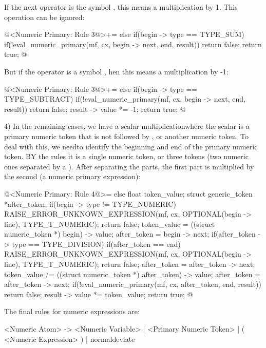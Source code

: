 If the next operator is the symbol \monoespaco{+}, this means a
multiplication by 1. This operation can be ignored:

\iniciocodigo
@<Numeric Primary: Rule 3@>+=
else if(begin -> type == TYPE_SUM){
  if(!eval_numeric_primary(mf, cx, begin -> next, end, result))
    return false;
  return true;
}
@
\fimcodigo

But if the operator is a symbol \monoespaco{-}, hen this means a
multiplication by -1:

\iniciocodigo
@<Numeric Primary: Rule 3@>+=
else if(begin -> type == TYPE_SUBTRACT){
  if(!eval_numeric_primary(mf, cx, begin -> next, end, result))
    return false;
  result -> value *= -1;
  return true;
}
@
\fimcodigo

4) In the remaining cases, we have a scalar multiplicationwhere the
scalar is a primary numeric token that is not followed
by \monoespaco{+}, \monoespaco{-} or another numeric token. To deal
with this, we needto identify the beginning and end of the primary
numeric token. BY the rules it is a single numeric token, or three
tokens (two numeric ones separated by a \monoespaco{/}). After
separating the parts, the first part is multiplied by the second (a
numeric primary expression):

\iniciocodigo
@<Numeric Primary: Rule 4@>=
else{
  float token_value;
  struct generic_token *after_token;
  if(begin -> type != TYPE_NUMERIC){
    RAISE_ERROR_UNKNOWN_EXPRESSION(mf, cx, OPTIONAL(begin -> line),
                                   TYPE_T_NUMERIC);
    return false;
  }
  token_value = ((struct numeric_token *) begin) -> value;
  after_token = begin -> next;
  if(after_token -> type == TYPE_DIVISION){
    if(after_token == end){
      RAISE_ERROR_UNKNOWN_EXPRESSION(mf, cx, OPTIONAL(begin -> line),
                                     TYPE_T_NUMERIC);
      return false;
    }
    after_token = after_token -> next;
    token_value /= ((struct numeric_token *) after_token) -> value;
    after_token = after_token -> next;
  }
  if(!eval_numeric_primary(mf, cx, after_token, end, result))
    return false;
  result -> value *= token_value;
  return true;
}
@
\fimcodigo


The final rules for numeric expressions are:

\alinhaverbatim
<Numeric Atom> -> <Numeric Variable> |
                  <Primary Numeric Token> |
                  ( <Numeric Expression> ) |
                  normaldeviate
\alinhanormal

